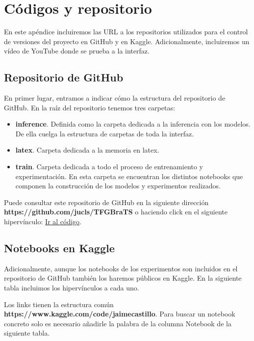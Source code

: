 \chapter{Códigos y repositorio}

En este apéndice incluiremos las URL a los repositorios utilizados para el control de versiones del proyecto en GitHub y en Kaggle. Adicionalmente, incluiremos un vídeo de YouTube donde se prueba a la interfaz.

\section{Repositorio de GitHub}

En primer lugar, entramos a indicar cómo la estructura del repositorio de GitHub. En la raíz del repositorio tenemos tres carpetas:

\begin{itemize}
	\item \textbf{inference}. Definida como la carpeta dedicada a la inferencia con los modelos. De ella cuelga la estructura de carpetas de toda la interfaz. 
	\item \textbf{latex}. Carpeta dedicada a la memoria en latex.
	\item \textbf{train}. Carpeta dedicada a todo el proceso de entrenamiento y experimentación. En esta carpeta se encuentran los distintos notebooks que componen la construcción de los modelos y experimentos realizados. 
\end{itemize}

Puede consultar este repositorio de GitHub en la siguiente dirección \textbf{https://github.com/jucls/TFGBraTS} o haciendo click en el siguiente hipervínculo: \href{https://github.com/jucls/TFGBraTS}{Ir al código}.

\section{Notebooks en Kaggle}

Adicionalmente, aunque los notebooks de los experimentos son incluidos en el repositorio de GitHub también los haremos públicos en Kaggle. En la siguiente tabla incluimos los hipervínculos a cada uno.

Los links tienen la estructura común \textbf{https://www.kaggle.com/code/jaimecastillo}. Para buscar un notebook concreto solo es necesario añadirle la palabra de la columna Notebook de la siguiente tabla.

